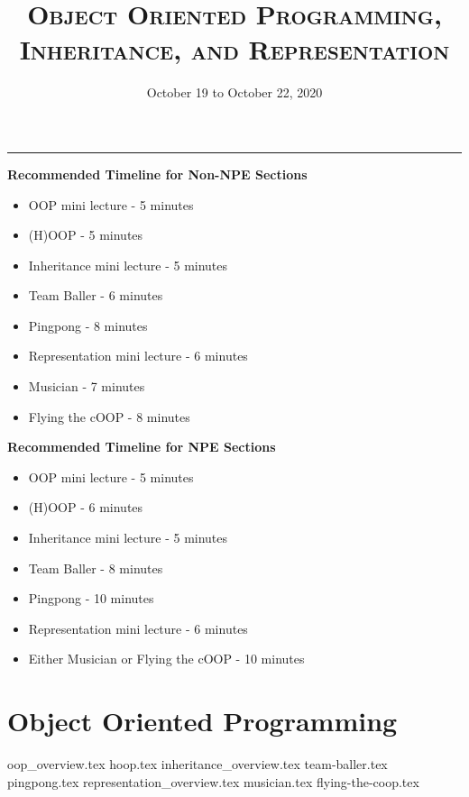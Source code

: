 \documentclass{exam}
\title{\textsc{Object Oriented Programming, Inheritance, and Representation}}
\date{October 19 to October 22, 2020}
\begin{document}
\maketitle
\rule{\textwidth}{0.15em}
\fontsize{12}{15}\selectfont

\begin{guide}
\textbf{Recommended Timeline for Non-NPE Sections}
\begin{itemize}
	\item OOP mini lecture - 5 minutes
	\item (H)OOP - 5 minutes
	\item Inheritance mini lecture - 5 minutes
	\item Team Baller - 6 minutes
	\item Pingpong - 8 minutes
	\item Representation mini lecture - 6 minutes
	\item Musician - 7 minutes
	\item Flying the cOOP - 8 minutes
\end{itemize}
\textbf{Recommended Timeline for NPE Sections}
\begin{itemize}
	\item OOP mini lecture - 5 minutes
	\item (H)OOP - 6 minutes
	\item Inheritance mini lecture - 5 minutes
	\item Team Baller - 8 minutes
	\item Pingpong - 10 minutes
	\item Representation mini lecture - 6 minutes
	\item Either Musician or Flying the cOOP - 10 minutes
\end{itemize}
\end{guide}
\section{Object Oriented Programming}
\begin{questions}
{oop_overview.tex}
{hoop.tex}
\newpage
{inheritance_overview.tex}
{team-baller.tex}
{pingpong.tex}
\newpage
{representation_overview.tex}
{musician.tex}
{flying-the-coop.tex}
\end{questions}
\end{document}
